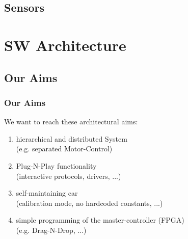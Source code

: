 \documentclass{beamer}
\begin{document}
\subsection{Sensors}


\section{SW Architecture}

\subsection{Our Aims}
\begin{frame}
	\frametitle{Our Aims}
	We want to reach these architectural aims:
	\begin{enumerate}
		\item hierarchical and distributed System\\
		(e.g. separated Motor-Control)
		\item Plug-N-Play functionality \\
		(interactive protocols, drivers, ...)
		\item self-maintaining car \\
		(calibration mode, no hardcoded constants, ...)
		\item simple programming of the master-controller (FPGA)\\
		(e.g. Drag-N-Drop, ...)
	\end{enumerate}
\end{frame}
\end{document}
